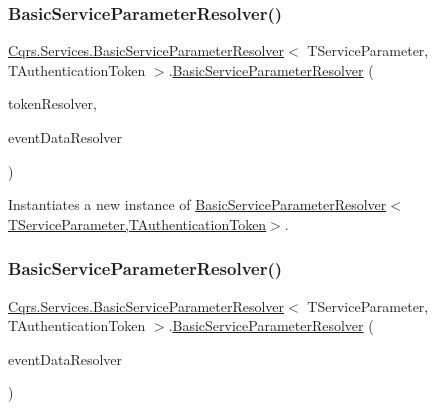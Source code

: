\subsubsection{\texorpdfstring{Basic\+Service\+Parameter\+Resolver()}{BasicServiceParameterResolver()}\hspace{0.1cm}{\footnotesize\ttfamily [1/2]}}
{\footnotesize\ttfamily \hyperlink{classCqrs_1_1Services_1_1BasicServiceParameterResolver}{Cqrs.\+Services.\+Basic\+Service\+Parameter\+Resolver}$<$ T\+Service\+Parameter, T\+Authentication\+Token $>$.\hyperlink{classCqrs_1_1Services_1_1BasicServiceParameterResolver}{Basic\+Service\+Parameter\+Resolver} (\begin{DoxyParamCaption}\item[{\hyperlink{interfaceCqrs_1_1Services_1_1ISingleSignOnTokenResolver}{I\+Single\+Sign\+On\+Token\+Resolver}}]{token\+Resolver,  }\item[{\hyperlink{interfaceCqrs_1_1Services_1_1IEventDataResolver}{I\+Event\+Data\+Resolver}}]{event\+Data\+Resolver }\end{DoxyParamCaption})\hspace{0.3cm}{\ttfamily [protected]}}



Instantiates a new instance of \hyperlink{classCqrs_1_1Services_1_1BasicServiceParameterResolver_af82f43a2f64aa5c33a3692a2a689367b_af82f43a2f64aa5c33a3692a2a689367b}{Basic\+Service\+Parameter\+Resolver$<$\+T\+Service\+Parameter,\+T\+Authentication\+Token$>$}. 

\mbox{\label{classCqrs_1_1Services_1_1BasicServiceParameterResolver_a74e001363a0226b4fbf5d3796e1230a9_a74e001363a0226b4fbf5d3796e1230a9}} 
\subsubsection{\texorpdfstring{Basic\+Service\+Parameter\+Resolver()}{BasicServiceParameterResolver()}\hspace{0.1cm}{\footnotesize\ttfamily [2/2]}}
{\footnotesize\ttfamily \hyperlink{classCqrs_1_1Services_1_1BasicServiceParameterResolver}{Cqrs.\+Services.\+Basic\+Service\+Parameter\+Resolver}$<$ T\+Service\+Parameter, T\+Authentication\+Token $>$.\hyperlink{classCqrs_1_1Services_1_1BasicServiceParameterResolver}{Basic\+Service\+Parameter\+Resolver} (\begin{DoxyParamCaption}\item[{\hyperlink{interfaceCqrs_1_1Services_1_1IEventDataResolver}{I\+Event\+Data\+Resolver}}]{event\+Data\+Resolver }\end{DoxyParamCaption})\hspace{0.3cm}{\ttfamily [protected]}}



